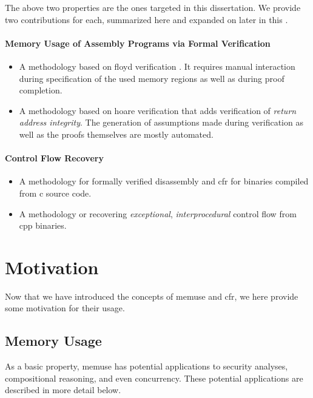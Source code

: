 The above two properties are the ones targeted in this dissertation.
We provide two contributions for each, summarized here and expanded on later in this .
\paragraph{Memory Usage of Assembly Programs via Formal Verification}
\begin{itemize}
  \item A methodology based on \gls{floyd} verification \autocite{floyd1967assigning}.
  It requires manual interaction during specification of the used memory regions as well as during proof completion.
  \item A methodology based on \gls{hoare} verification \autocite{hoare1969axiomatic} that adds verification of \emph{return address integrity}.
  The generation of assumptions made during verification as well as the proofs themselves are mostly automated.
\end{itemize}

\paragraph{Control Flow Recovery}
\begin{itemize}
  \item A methodology for formally verified disassembly and \gls{cfr} for binaries compiled from \gls{c} source code.
  \item A methodology or recovering \emph{exceptional}, \emph{interprocedural} control flow from \gls{cpp} binaries.
\end{itemize}

\section{Motivation}
Now that we have introduced the concepts of \gls{memuse} and \gls{cfr}, we here provide some motivation for their usage.

\subsection{Memory Usage}
As a basic property, \gls{memuse} has potential applications to security analyses, compositional reasoning, and even concurrency.
These potential applications are described in more detail below.

